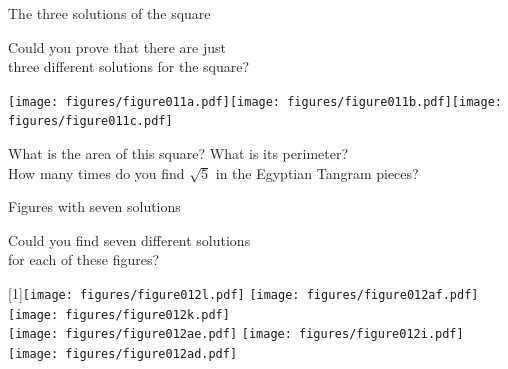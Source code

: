 \documentclass[14pt]{beamer}
\begin{document}

    \begin{frame}{The three solutions of the square}

        \vspace{-1em}
        \begin{center}
            Could you prove that there are just\\three different solutions for the square?

            \bigskip\bigskip

            \texttt{[image: figures/figure011a.pdf]}\quad\texttt{[image: figures/figure011b.pdf]}\quad\texttt{[image: figures/figure011c.pdf]} \\

            \bigskip\bigskip

            {\footnotesize What is the area of this square? What is its perimeter?\\How many times do you find $\sqrt{5}$ in the Egyptian Tangram pieces?}
        \end{center}
    \end{frame}


    \begin{frame}{Figures with seven solutions}

        \vspace{-1em}
        \begin{center}
            Could you find seven different solutions\\for each of these figures?

            \bigskip\bigskip

            \scalebox{-1}[1]{\texttt{[image: figures/figure012l.pdf]}}\qquad
            \texttt{[image: figures/figure012af.pdf]}\qquad
            \texttt{[image: figures/figure012k.pdf]}\quad\;\;\phantom{.}\\[4ex]
            \texttt{[image: figures/figure012ae.pdf]}\quad\qquad
            \texttt{[image: figures/figure012i.pdf]}\qquad\quad
            \texttt{[image: figures/figure012ad.pdf]}\\
        \end{center}
    \end{frame}

\end{document}
